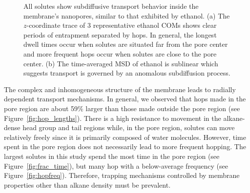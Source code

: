 \documentclass[journal=jpcbfk,manuscript=article]{achemso}
\begin{document}
\begin{figure}[!htb]
\begin{subfigure}{0.49\textwidth}
  \caption{}\label{fig:example_msd}
  \end{subfigure}
  \caption{All solutes show subdiffusive transport behavior inside the membrane's
  nanopores, similar to that exhibited by ethanol. (a) The $z$-coordinate trace of
  3 representative ethanol COMs shows clear periods of entrapment separated by hops.
  In general, the longest dwell times occur when solutes are situated far from the
  pore center and more frequent hops occur when solutes are close to the pore center.
  (b) The time-averaged MSD of ethanol is sublinear which suggests transport is
  governed by an anomalous subdiffusion process.}\label{fig:qualitative_mechanisms}
  \end{figure}
  
  The complex and inhomogeneous structure of the membrane leads to radially
  dependent transport mechanisms. In general, we observed that hops 
  made in the pore region are about 59\% larger than those made outside
  the pore region (see Figure~\ref{fig:hop_lengths}). There is a high 
  resistance to movement in the alkane-dense head group and tail regions
  while, in the pore region, solutes can move relatively freely since it 
  is primarily composed of water molecules. However, time spent in the 
  pore region does not necessarily lead to more frequent hopping. The 
  largest solutes in this study spend the most time in the pore region
  (see Figure~\ref{fig:frac_time}), but many hop with a below-average
  frequency (see Figure~\ref{fig:hopfreq}). Therefore, trapping mechanisms
  controlled by membrane properties other than alkane density must be prevalent.
\end{document}
